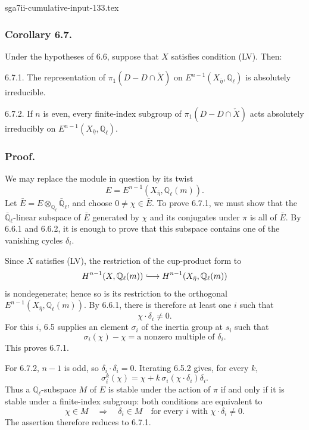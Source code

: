 \begin{filecontents*}{sga7ii-cumulative-input-133.tex}
\subsubsection*{Corollary 6.7.}
Under the hypotheses of 6.6, suppose that $X$ satisfies condition
(LV).  Then:

\medskip
\noindent
\textup{6.7.1.} The representation of
$\pi_1(D-D\cap\check X)$ on
$E^{n-1}(X_{\bar\eta},\mathbb Q_\ell)$ is absolutely irreducible.

\medskip
\noindent
\textup{6.7.2.} If $n$ is even, every finite-index subgroup of
$\pi_1(D-D\cap\check X)$ acts absolutely irreducibly on
$E^{n-1}(X_{\bar\eta},\mathbb Q_\ell)$.

\subsubsection*{Proof.}
We may replace the module in question by its twist
\[
E=E^{n-1}(X_{\bar\eta},\mathbb Q_\ell(m)).
\]
Let
$\bar E=E\otimes_{\mathbb Q_\ell}\bar{\mathbb Q}_\ell$, and choose
$0\ne\chi\in\bar E$.  To prove 6.7.1, we must show that the
$\bar{\mathbb Q}_\ell$-linear subspace of $\bar E$ generated by $\chi$
and its conjugates under $\pi$ is all of $\bar E$.  By 6.6.1 and 6.6.2,
it is enough to prove that this subspace contains one of the vanishing
cycles $\delta_i$.

Since $X$ satisfies (LV), the restriction of the cup-product form to
\[
H^{n-1}(X,\mathbb Q_\ell(m))
\lhook\joinrel\longrightarrow
H^{n-1}(X_{\bar\eta},\mathbb Q_\ell(m))
\]
is nondegenerate; hence so is its restriction to the orthogonal
$E^{n-1}(X_{\bar\eta},\mathbb Q_\ell(m))$.  By 6.6.1, there is therefore
at least one $i$ such that
\[
\chi\cdot\delta_i\ne0.
\]
For this $i$, 6.5 supplies an element $\sigma_i$ of the inertia group at
$s_i$ such that
\begin{equation}\tag{6.7.3}
\sigma_i(\chi)-\chi
=\text{a nonzero multiple of }\delta_i.
\end{equation}
This proves 6.7.1.

For 6.7.2, $n-1$ is odd, so $\delta_i\cdot\delta_i=0$.  Iterating
6.5.2 gives, for every $k$,
\begin{equation}\tag{6.7.4}
\sigma_i^k(\chi)
=\chi+k\,\sigma_i(\chi\cdot\delta_i)\delta_i.
\end{equation}
Thus a $\mathbb Q_\ell$-subspace $M$ of $E$ is stable under the action
of $\pi$ if and only if it is stable under a finite-index subgroup:
both conditions are equivalent to
\[
\chi\in M
\quad\Longrightarrow\quad
\delta_i\in M\quad\text{for every $i$ with }
\chi\cdot\delta_i\ne0.
\]
The assertion therefore reduces to 6.7.1.


\end{filecontents*}
